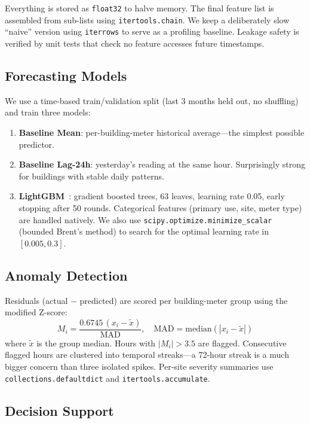 \documentclass[conference]{IEEEtran}
\begin{document}
Everything is stored as \texttt{float32} to halve memory. The final feature list is assembled from sub-lists using \texttt{itertools.chain}. We keep a deliberately slow ``naive'' version using \texttt{iterrows} to serve as a profiling baseline. Leakage safety is verified by unit tests that check no feature accesses future timestamps.

\subsection{Forecasting Models}

We use a time-based train/validation split (last 3 months held out, no shuffling) and train three models:

\begin{enumerate}[noitemsep,leftmargin=*]
\item \textbf{Baseline Mean}: per-building-meter historical average---the simplest possible predictor.
\item \textbf{Baseline Lag-24h}: yesterday's reading at the same hour. Surprisingly strong for buildings with stable daily patterns.
\item \textbf{LightGBM}~\cite{ke2017}: gradient boosted trees, 63 leaves, learning rate 0.05, early stopping after 50 rounds. Categorical features (primary use, site, meter type) are handled natively. We also use \texttt{scipy.optimize.minimize\_scalar} (bounded Brent's method) to search for the optimal learning rate in $[0.005, 0.3]$.
\end{enumerate}

\subsection{Anomaly Detection}

Residuals (actual $-$ predicted) are scored per building-meter group using the modified Z-score:
\begin{equation}
M_i = \frac{0.6745\,(x_i - \tilde{x})}{\text{MAD}}, \quad \text{MAD} = \text{median}(|x_i - \tilde{x}|)
\end{equation}
where $\tilde{x}$ is the group median. Hours with $|M_i| > 3.5$ are flagged. Consecutive flagged hours are clustered into temporal streaks---a 72-hour streak is a much bigger concern than three isolated spikes. Per-site severity summaries use \texttt{collections.defaultdict} and \texttt{itertools.accumulate}.

\subsection{Decision Support}
\end{document}
